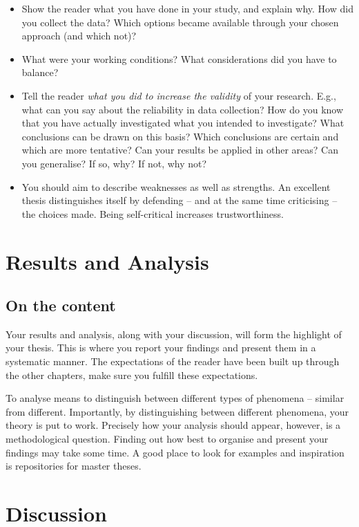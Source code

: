 \documentclass[a4paper,twoside]{bth}
\begin{document}
\begin{itemize}
    \item Show the reader what you have done in your study, and explain why. How did you collect the data? Which options became available through your chosen approach (and which not)?
    \item What were your working conditions? What considerations did you have to balance?
    \item Tell the reader \emph{what you did to increase the validity} of
    your research. E.g., what can you say about the reliability in data
    collection? How do you know that you have actually investigated what you
    intended to investigate? What conclusions can be drawn on this basis?
    Which conclusions are certain and which are more tentative? Can your
    results be applied in other areas? Can you generalise? If so, why? If
    not, why not?
    \item You should aim to describe weaknesses as well as strengths. An excellent thesis distinguishes itself by defending -- and at the same time criticising -- the choices made. Being self-critical increases trustworthiness.
\end{itemize}


\chapter{Results and Analysis}
\label{chp:results}
\section{On the content}
Your results and analysis, along with your discussion, will form the highlight of your thesis. This is where you report your findings and present them in a systematic manner. The expectations of the reader have been built up through the other chapters, make sure you fulfill these expectations.

To analyse means to distinguish between different types of phenomena -- similar from different. Importantly, by distinguishing between different phenomena, your theory is put to work. Precisely how your analysis should appear, however, is a methodological question. Finding out how best to organise and present your findings may take some time. A good place to look for examples and inspiration is repositories for master theses.


\chapter{Discussion}
\label{chp:discussion}
\end{document}
